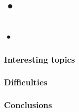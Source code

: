 \documentclass[12pt,letterpaper]{book}
\begin{document}
\chapter{•}
\section{•}

	\subsection{Interesting topics}

	\subsection{Difficulties}

	\subsection{Conclusions}


\printbibliography[title={Bibliographie}]
\end{document}

